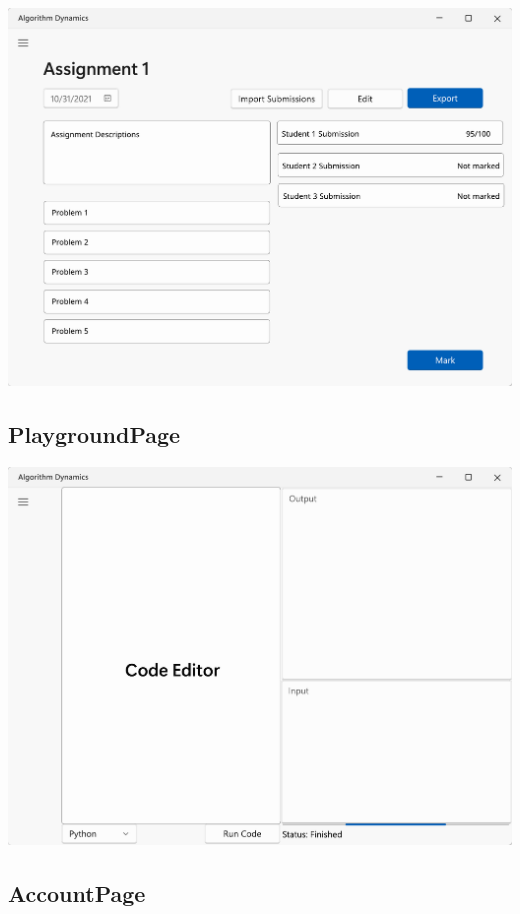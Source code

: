 \documentclass[a4paper]{report}
\begin{document}
\includegraphics[width=\textwidth, height=\textheight, keepaspectratio]{AssignmentsTeacherDetailsPage-design}

\subsection{PlaygroundPage}

\includegraphics[width=\textwidth, height=\textheight, keepaspectratio]{PlaygroundPage-design}

\subsection{AccountPage}
\end{document}
